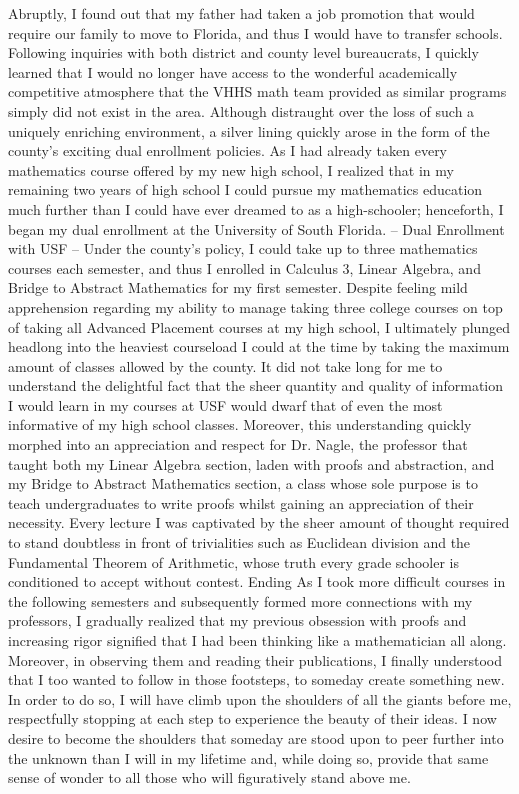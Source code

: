 \documentclass[12pt]{article}
\begin{document}
\begin{outline}[enumerate]
      \3 Abruptly, I found out that my father had taken a job promotion that would require our family to move to Florida, and thus I would have to transfer schools. Following inquiries with both district and county level bureaucrats, I quickly learned that I would no longer have access to the wonderful academically competitive atmosphere that the VHHS math team provided as similar programs simply did not exist in the area.
      \3 Although distraught over the loss of such a uniquely enriching environment, a silver lining quickly arose in the form of the county's exciting dual enrollment policies. As I had already taken every mathematics course offered by my new high school, I realized that in my remaining two years of high school I could pursue my mathematics education much further than I could have ever dreamed to as a high-schooler; henceforth, I began my dual enrollment at the University of South Florida.
    \2 -- Dual Enrollment with USF --
      \3 Under the county's policy, I could take up to three mathematics courses each semester, and thus I enrolled in Calculus 3, Linear Algebra, and Bridge to Abstract Mathematics for my first semester. Despite feeling mild apprehension regarding my ability to manage taking three college courses on top of taking all Advanced Placement courses at my high school, I ultimately plunged headlong into the heaviest courseload I could at the time by taking the maximum amount of classes allowed by the county. It did not take long for me to understand the delightful fact that the sheer quantity and quality of information I would learn in my courses at USF would dwarf that of even the most informative of my high school classes. Moreover, this understanding quickly morphed into an appreciation and respect for Dr. Nagle, the professor that taught both my Linear Algebra section, laden with proofs and abstraction, and my Bridge to Abstract Mathematics section, a class whose sole purpose is to teach undergraduates to write proofs whilst gaining an appreciation of their necessity. Every lecture I was captivated by the sheer amount of thought required to stand doubtless in front of trivialities such as Euclidean division and the Fundamental Theorem of Arithmetic, whose truth every grade schooler is conditioned to accept without contest.
    \2 Ending
      \3 As I took more difficult courses in the following semesters and subsequently formed more connections with my professors, I gradually realized that my previous obsession with proofs and increasing rigor signified that I had been thinking like a mathematician all along. Moreover, in observing them and reading their publications, I finally understood that I too wanted to follow in those footsteps, to someday create something new. In order to do so, I will have climb upon the shoulders of all the giants before me, respectfully stopping at each step to experience the beauty of their ideas. I now desire to become the shoulders that someday are stood upon to peer further into the unknown than I will in my lifetime and, while doing so, provide that same sense of wonder to all those who will figuratively stand above me.


\end{outline}



\end{document}
